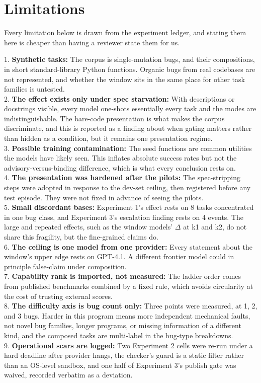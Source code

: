 \section{Limitations}

Every limitation below is drawn from the experiment ledger, and stating them here is cheaper than having a reviewer state them for us.

1. \textbf{Synthetic tasks:} The corpus is single-mutation bugs, and their compositions, in short standard-library Python functions. Organic bugs from real codebases are not represented, and whether the window sits in the same place for other task families is untested.\\
2. \textbf{The effect exists only under spec starvation:} With descriptions or docstrings visible, every model one-shots essentially every task and the modes are indistinguishable. The bare-code presentation is what makes the corpus discriminate, and this is reported as a finding about when gating matters rather than hidden as a condition, but it remains one presentation regime.\\
3. \textbf{Possible training contamination:} The seed functions are common utilities the models have likely seen. This inflates absolute success rates but not the advisory-versus-binding difference, which is what every conclusion rests on.\\
4. \textbf{The presentation was hardened after the pilots:} The spec-stripping steps were adopted in response to the dev-set ceiling, then registered before any test episode. They were not fixed in advance of seeing the pilots.\\
5. \textbf{Small discordant bases:} Experiment 1's effect rests on 8 tasks concentrated in one bug class, and Experiment 3's escalation finding rests on 4 events. The large and repeated effects, such as the window models' $\Delta$ at k1 and k2, do not share this fragility, but the fine-grained claims do.\\
6. \textbf{The ceiling is one model from one provider:} Every statement about the window's upper edge rests on GPT-4.1. A different frontier model could in principle false-claim under composition.\\
7. \textbf{Capability rank is imported, not measured:} The ladder order comes from published benchmarks combined by a fixed rule, which avoids circularity at the cost of trusting external scores.\\
8. \textbf{The difficulty axis is bug count only:} Three points were measured, at 1, 2, and 3 bugs. Harder in this program means more independent mechanical faults, not novel bug families, longer programs, or missing information of a different kind, and the composed tasks are multi-label in the bug-type breakdowns.\\
9. \textbf{Operational scars are logged:} Two Experiment 2 cells were re-run under a hard deadline after provider hangs, the checker's guard is a static filter rather than an OS-level sandbox, and one half of Experiment 3's publish gate was waived, recorded verbatim as a deviation.

